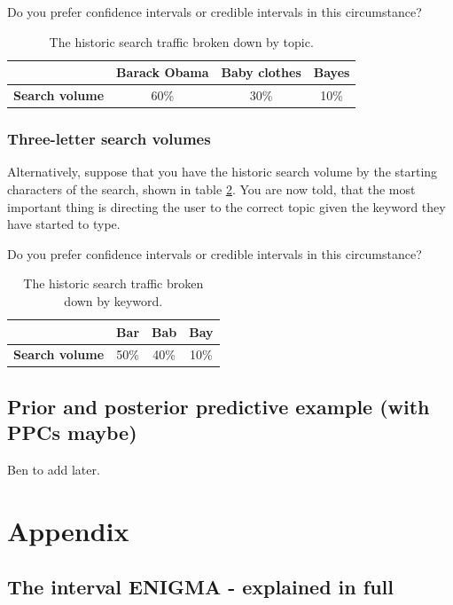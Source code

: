 \documentclass[11pt,fullpage]{book}
\begin{document}
Do you prefer confidence intervals or credible intervals in this circumstance?

\begin{table}[htbp]
  \centering
    \begin{tabular}{rccc}
    \toprule
          & \textbf{Barack Obama} & \textbf{Baby clothes} & \textbf{Bayes} \\
    \midrule
    \textbf{Search volume} & 60\%  & 30\%  & 10\% \\
    \bottomrule
    \end{tabular}%
  \caption{The historic search traffic broken down by topic.}\label{tab:Posterior_PS_googleIntervalHistoricTopic}%
\end{table}%

\subsubsection{Three-letter search volumes}
Alternatively, suppose that you have the historic search volume by the starting characters of the search, shown in table \ref{tab:Posterior_PS_googleIntervalHistoricKeyword}. You are now told, that the most important thing is directing the user to the correct topic given the keyword they have started to type.

Do you prefer confidence intervals or credible intervals in this circumstance?


\begin{table}[htbp]
  \centering
    \begin{tabular}{cccc}
    \toprule
          & \textbf{Bar} & \textbf{Bab} & \textbf{Bay} \\
    \midrule
    \textbf{Search volume} & 50\%  & 40\%  & 10\% \\
    \bottomrule
    \end{tabular}%
  \caption{The historic search traffic broken down by keyword.}\label{tab:Posterior_PS_googleIntervalHistoricKeyword}%
\end{table}%


\subsection{Prior and posterior predictive example (with PPCs maybe)}
Ben to add later.

\section{Appendix}
\subsection{The interval ENIGMA - explained in full}\label{sec:Posterior_appendixConfidenceInterval}
\end{document}
